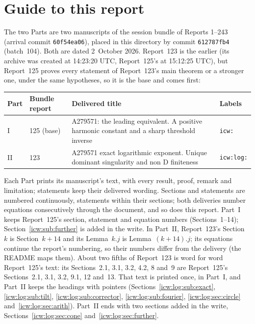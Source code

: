 \documentclass[11pt,letterpaper]{article}
\theoremstyle{remark}\newtheorem{remark}[theorem]{Remark}
\newcommand{\1}{\mathbf1}
\begin{document}
\section*{Guide to this report}\label{icw:sec:guide}
The two Parts are two manuscripts of the session bundle of Reports 1--243 (arrival commit \texttt{60f54ea06}), placed in this directory by commit \texttt{612787fb4} (batch~104). Both are dated 2~October 2026. Report~123 is the earlier (its archive was created at 14:23:20 UTC, Report~125's at 15:12:25 UTC), but Report~125 proves every statement of Report~123's main theorem or a stronger one, under the same hypotheses, so it is the base and comes first:
\begin{center}
\small
\begin{tabular}{@{}l l >{\raggedright\arraybackslash}p{} l@{}}
\toprule
Part & Bundle report & Delivered title & Labels\\
\midrule
I & 125 (base) & A279571: the leading equivalent. A positive harmonic constant and a sharp threshold inverse & \texttt{icw:}\\
II & 123 & A279571 exact logarithmic exponent. Unique dominant singularity and non D finiteness & \texttt{icw:log:}\\
\bottomrule
\end{tabular}
\end{center}
Each Part prints its manuscript's text, with every result, proof, remark and limitation; statements keep their delivered wording. Sections and statements are numbered continuously, statements within their sections; both deliveries number equations consecutively through the document, and so does this report. Part~I keeps Report~125's section, statement and equation numbers (Sections~1--14); Section~\ref{icw:sub:further} is added in the write. In Part~II, Report~123's Section~$k$ is Section~$k+14$ and its Lemma~$k.j$ is Lemma~$(k+14).j$; its equations continue the report's numbering, so their numbers differ from the delivery (the README maps them). About two fifths of Report~123 is word for word Report~125's text: its Sections~2.1, 3.1, 3.2, 4.2, 8 and~9 are Report~125's Sections~2.1, 3.1, 3.2, 9.1, 12 and~13. That text is printed once, in Part~I, and Part~II keeps the headings with pointers (Sections~\ref{icw:log:sub:exact}, \ref{icw:log:sub:tilt}, \ref{icw:log:sub:corrector}, \ref{icw:log:sub:fourier}, \ref{icw:log:sec:circle} and~\ref{icw:log:sec:arith}). Part~II ends with two sections added in the write, Sections~\ref{icw:log:sec:cone} and~\ref{icw:log:sec:further}.
\end{document}
